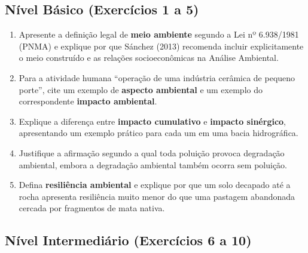 
\subsection*{Nível Básico (Exercícios 1 a 5)}

\begin{enumerate}[leftmargin=1.8em, itemsep=4pt]
  \item Apresente a definição legal de \textbf{meio ambiente} segundo a Lei nº 6.938/1981 (PNMA) e explique por que Sánchez (2013) recomenda incluir explicitamente o meio construído e as relações socioeconômicas na Análise Ambiental.
  \espacoResolucao[2.0cm]

  \item Para a atividade humana ``operação de uma indústria cerâmica de pequeno porte'', cite um exemplo de \textbf{aspecto ambiental} e um exemplo do correspondente \textbf{impacto ambiental}.
  \espacoResolucao[2.0cm]

  \item Explique a diferença entre \textbf{impacto cumulativo} e \textbf{impacto sinérgico}, apresentando um exemplo prático para cada um em uma bacia hidrográfica.
  \espacoResolucao[2.0cm]

  \item Justifique a afirmação segundo a qual toda poluição provoca degradação ambiental, embora a degradação ambiental também ocorra sem poluição.
  \espacoResolucao[2.0cm]

  \item Defina \textbf{resiliência ambiental} e explique por que um solo decapado até a rocha apresenta resiliência muito menor do que uma pastagem abandonada cercada por fragmentos de mata nativa.
  \espacoResolucao[2.0cm]
\end{enumerate}

\subsection*{Nível Intermediário (Exercícios 6 a 10)}

